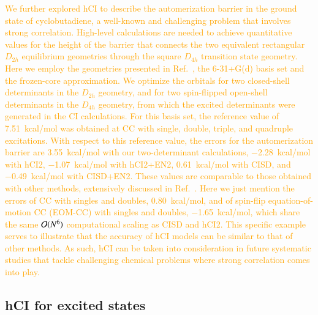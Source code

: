 \documentclass[aip,jcp,reprint,noshowkeys,superscriptaddress]{revtex4-1}
\newcommand{\fk}[1]{\textcolor{orange}{#1}}
\begin{document}
\fk{
We further explored hCI to describe the automerization barrier in the ground state of cyclobutadiene,
a well-known and challenging problem that involves strong correlation. \cite{Monino_2022}
High-level calculations are needed to achieve quantitative values for the height of the barrier that 
connects the two equivalent rectangular $D_{2h}$ equilibrium geometries through the square $D_{4h}$ transition state geometry. \cite{Monino_2022}
Here we employ the geometries presented in Ref.~\onlinecite{Monino_2022}, the 6-31+G(d) basis set and the frozen-core approximation.
We optimize the orbitals for two closed-shell determinants in the $D_{2h}$ geometry, and for two spin-flipped open-shell determinants in the $D_{4h}$ geometry, from which the excited determinants were generated in the CI calculations.
For this basis set, the reference value of \SI{7.51}{kcal/mol} was obtained at CC with single, double, triple, and quadruple excitations. \cite{Monino_2022}
With respect to this reference value, the errors for the automerization barrier are
\SI{+3.55}{kcal/mol} with our two-determinant calculations, \SI{-2.28}{kcal/mol} with hCI2, \SI{-1.07}{kcal/mol} with hCI2+EN2, \SI{+0.61}{kcal/mol} with CISD, and \SI{-0.49}{kcal/mol} with CISD+EN2.
These values are comparable to those obtained with other methods, extensively discussed in Ref.~\onlinecite{Monino_2022}.
Here we just mention the errors of CC with singles and doubles, \SI{+0.80}{kcal/mol}, and of spin-flip equation-of-motion CC (EOM-CC) with singles and doubles, \SI{-1.65}{kcal/mol},
which share the same $\order*{N^6}$ computational scaling as CISD and hCI2.
This specific example serves to illustrate that the accuracy of hCI models can be similar to that of other methods.
As such, hCI can be taken into consideration in future systematic studies that tackle challenging chemical problems where strong correlation comes into play.
}

\subsection{hCI for excited states}
\label{sec:res_C}
\end{document}

